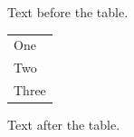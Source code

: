 \documentclass[12pt]{article}
\begin{document}
Text before the table.

\begin{tabular}{l}One\\[6pt]Two\\[1em]Three\end{tabular}

Text after the table.
\end{document}
